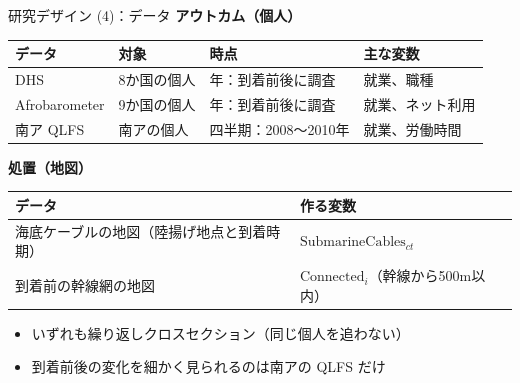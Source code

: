 \documentclass[aspectratio=169,11pt]{beamer}
\begin{document}
\begin{frame}{研究デザイン (4)：データ}
  \small
  \textbf{アウトカム（個人）}\\[0.3em]
  \begin{tabular}{llll}
    \toprule
    データ & 対象 & 時点 & 主な変数 \\
    \midrule
    DHS           & 8か国の個人 & 年：到着前後に調査   & 就業、職種 \\
    Afrobarometer & 9か国の個人 & 年：到着前後に調査   & 就業、ネット利用 \\
    南ア QLFS     & 南アの個人  & 四半期：2008〜2010年 & 就業、労働時間 \\
    \bottomrule
  \end{tabular}
  \vspace{0.8em}

  \textbf{処置（地図）}\\[0.3em]
  \begin{tabular}{ll}
    \toprule
    データ & 作る変数 \\
    \midrule
    海底ケーブルの地図（陸揚げ地点と到着時期） & $\text{SubmarineCables}_{ct}$ \\
    到着前の幹線網の地図                       & $\text{Connected}_i$（幹線から500m以内） \\
    \bottomrule
  \end{tabular}
  \vspace{0.8em}

  \begin{itemize}
    \item いずれも\alert{繰り返しクロスセクション}（同じ個人を追わない）
    \item 到着前後の変化を細かく見られるのは\alert{南アの QLFS だけ}
  \end{itemize}
\end{frame}
\end{document}
